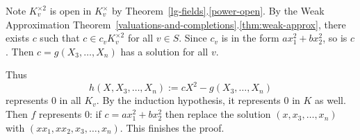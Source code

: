 Note $K_v^{\times2}$ is open in $K_v^{\times}$ by Theorem~\ref{lg-fields}.\ref{power-open}. %
By the Weak Approximation Theorem~\ref{valuations-and-completions}.\ref{thm:weak-approx}, there exists $c$ such that $c\in c_vK_v^{\times 2}$ for all $v\in S$. Since $c_v$ is in the form $ax_1^2+bx_2^2$, so is $c$. Then $c=g(X_3,\ldots, X_n)$ has a solution for all $v$.

Thus
\[
h(X,X_3,\ldots, X_n):=cX^2-g(X_3,\ldots, X_n)
\]
represents 0 in all $K_v$. By the induction hypothesis, it represents 0 in $K$ as well. Then $f$ represents 0: if $c=ax_1^2+bx_2^2$ then replace the solution $(x,x_3,\ldots, x_n)$ with $(xx_1,xx_2,x_3,\ldots, x_n)$. This finishes the proof.

